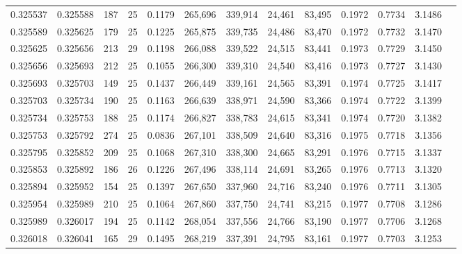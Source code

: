 \begin{tabular}{rrrrrrrrrrrrr}
0.325537 & 0.325588 &   187 &  25 &                                     0.1179 & 265,696 & 339,914 &  24,461 &  83,495 & 0.1972 & 0.7734 & 3.1486 \\
0.325589 & 0.325625 &   179 &  25 &                                     0.1225 & 265,875 & 339,735 &  24,486 &  83,470 & 0.1972 & 0.7732 & 3.1470 \\
0.325625 & 0.325656 &   213 &  29 &                                     0.1198 & 266,088 & 339,522 &  24,515 &  83,441 & 0.1973 & 0.7729 & 3.1450 \\
0.325656 & 0.325693 &   212 &  25 &                                     0.1055 & 266,300 & 339,310 &  24,540 &  83,416 & 0.1973 & 0.7727 & 3.1430 \\
0.325693 & 0.325703 &   149 &  25 &                                     0.1437 & 266,449 & 339,161 &  24,565 &  83,391 & 0.1974 & 0.7725 & 3.1417 \\
0.325703 & 0.325734 &   190 &  25 &                                     0.1163 & 266,639 & 338,971 &  24,590 &  83,366 & 0.1974 & 0.7722 & 3.1399 \\
0.325734 & 0.325753 &   188 &  25 &                                     0.1174 & 266,827 & 338,783 &  24,615 &  83,341 & 0.1974 & 0.7720 & 3.1382 \\
0.325753 & 0.325792 &   274 &  25 &                                     0.0836 & 267,101 & 338,509 &  24,640 &  83,316 & 0.1975 & 0.7718 & 3.1356 \\
0.325795 & 0.325852 &   209 &  25 &                                     0.1068 & 267,310 & 338,300 &  24,665 &  83,291 & 0.1976 & 0.7715 & 3.1337 \\
0.325853 & 0.325892 &   186 &  26 &                                     0.1226 & 267,496 & 338,114 &  24,691 &  83,265 & 0.1976 & 0.7713 & 3.1320 \\
0.325894 & 0.325952 &   154 &  25 &                                     0.1397 & 267,650 & 337,960 &  24,716 &  83,240 & 0.1976 & 0.7711 & 3.1305 \\
0.325954 & 0.325989 &   210 &  25 &                                     0.1064 & 267,860 & 337,750 &  24,741 &  83,215 & 0.1977 & 0.7708 & 3.1286 \\
0.325989 & 0.326017 &   194 &  25 &                                     0.1142 & 268,054 & 337,556 &  24,766 &  83,190 & 0.1977 & 0.7706 & 3.1268 \\
0.326018 & 0.326041 &   165 &  29 &                                     0.1495 & 268,219 & 337,391 &  24,795 &  83,161 & 0.1977 & 0.7703 & 3.1253 \\

\end{tabular}
